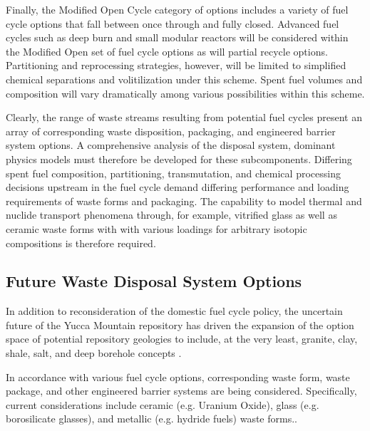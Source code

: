Finally, the Modified Open Cycle category of options includes a 
variety of fuel cycle options that fall between once through and fully 
closed. Advanced fuel cycles such as deep burn and small modular 
reactors will be considered within the Modified Open set of fuel cycle 
options as will partial recycle options. Partitioning and reprocessing 
strategies, however, will be limited to simplified chemical 
separations and volitilization under this scheme. Spent fuel volumes 
and composition will vary dramatically among various possibilities 
within this scheme.  
\cite{department_of_energy_-_nuclear_energy_nuclear_2010} 

Clearly, the range of waste streams resulting from potential fuel 
cycles present an array of corresponding waste disposition, packaging, 
and engineered barrier system options. A comprehensive analysis of the 
disposal system, dominant physics models must therefore be developed 
for these subcomponents.  Differing spent fuel composition, 
partitioning, transmutation, and chemical processing decisions 
upstream in the fuel cycle demand differing performance and loading 
requirements of waste forms and packaging. The capability to model 
thermal and nuclide transport phenomena through, for example, 
vitrified glass as well as ceramic waste forms with with various 
loadings for arbitrary isotopic compositions is therefore required.  

\subsection{Future Waste Disposal System Options}

In addition to reconsideration of the domestic fuel cycle policy, the 
uncertain future of the Yucca Mountain repository has driven the 
expansion of the option space of potential repository geologies to 
include, at the very least, granite, clay, shale, salt, and deep 
borehole concepts \cite{nutt_used_2010}. 

In accordance with various fuel cycle options, corresponding waste 
form, waste package, and other engineered barrier systems are being 
considered. Specifically, current considerations include ceramic (e.g.  
Uranium Oxide), glass (e.g.  borosilicate glasses), and metallic (e.g.  
hydride fuels) waste forms.. 

